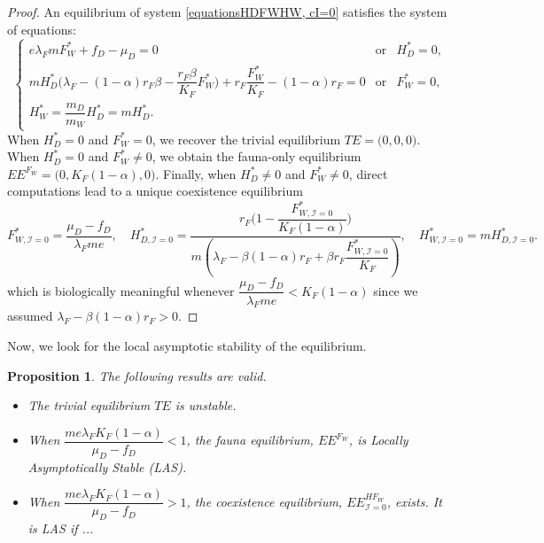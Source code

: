\documentclass{article}
\newcommand{\lfw}{\lambda_{F}}
\newcommand{\lfw}{\lambda_{F}}
\newcommand{\Kfa}{K_{F,\alpha}}
\newcommand{\cI}{\mathcal{I}}
\newtheorem{prop}{Proposition}
\begin{document}
\begin{proof}
An equilibrium of system \eqref{equationsHDFWHW, cI=0} satisfies the system of equations:
\begin{equation}\label{system-equilibre, cI=0}
\left\lbrace \begin{array}{cll}
 e \lfw m F_W^* + f_D - \mu_D = 0& \mbox{or} & H_D^* = 0,\\
m H_D^*\Big(\lfw - (1-\alpha)r_F \beta - \dfrac{r_F \beta}{K_F}F_W^* \Big) + r_F \dfrac{F_W^*}{K_F} - (1-\alpha)r_F= 0& \mbox{or} & F^*_W = 0,\\
H_W^* = \dfrac{m_D}{m_W} H_D^* = m H_D^*.&&
\end{array} \right.
\end{equation}
When $H_D^*=0$ and $F_W^*=0$, we recover the trivial equilibrium $TE = \Big(0,0,0\Big)$. When $H_D^*=0$ and $F_W^*\neq0$, we obtain the fauna-only equilibrium $EE^{F_W} = \Big(0, K_F(1-\alpha), 0 \Big)$. Finally, when $H_D^*\neq0$ and $F_W^*\neq0$, direct computations lead to a unique coexistence equilibrium 
$$F^*_{W, \cI = 0} = \dfrac{\mu_D - f_D}{\lfw m e},
\quad 
H^*_{D, \cI = 0} = \dfrac{r_F\Big(1 - \dfrac{F^*_{W, \cI = 0}}{K_F(1-\alpha)} \Big)}{m\left(\lfw - \beta (1-\alpha) r_F + \beta r_F  \dfrac{F^*_{W, \cI = 0}}{K_F}\right)} ,
\quad 
H^*_{W, \cI = 0} = m H^*_{D, \cI = 0}.$$
which is biologically meaningful whenever $\dfrac{\mu_D - f_D}{\lfw m e} < K_F(1-\alpha)$ since we assumed $\lfw - \beta (1-\alpha) r_F > 0$.
\end{proof}

Now, we look for the local asymptotic stability of the equilibrium.

\begin{prop}\label{propLAS, cI=0} The following results are valid.
\begin{itemize}
\item The trivial equilibrium $TE$ is unstable.
\item When $\dfrac{m e \lfw K_F(1-\alpha)}{\mu_D - f_D} < 1$, the fauna equilibrium, $EE^{F_W}$, is Locally Asymptotically Stable (LAS).
\item When $\dfrac{m e \lfw K_F(1-\alpha)}{\mu_D - f_D} > 1$, the coexistence equilibrium, $EE^{HF_W}_{\cI =0}$, exists. It is LAS if ...
\end{itemize}
\end{prop}
\end{document}
